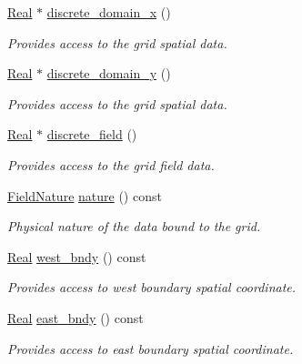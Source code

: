 \begin{DoxyCompactItemize}
\hyperlink{group__c01-roots_gac080bbbf5cbb5502c9f00405f894857d}{Real} $\ast$ \hyperlink{classmtk_1_1UniStgGrid2D_ad5dcac20a90f77a96fb7e843f791eba0}{discrete\+\_\+domain\+\_\+x} ()
\begin{DoxyCompactList}\small\item\em Provides access to the grid spatial data. \end{DoxyCompactList}\item 
\hyperlink{group__c01-roots_gac080bbbf5cbb5502c9f00405f894857d}{Real} $\ast$ \hyperlink{classmtk_1_1UniStgGrid2D_abea1624fd9db856806966151df0ca969}{discrete\+\_\+domain\+\_\+y} ()
\begin{DoxyCompactList}\small\item\em Provides access to the grid spatial data. \end{DoxyCompactList}\item 
\hyperlink{group__c01-roots_gac080bbbf5cbb5502c9f00405f894857d}{Real} $\ast$ \hyperlink{classmtk_1_1UniStgGrid2D_af5b29643a6e50cff2d5d0b2e07f029b7}{discrete\+\_\+field} ()
\begin{DoxyCompactList}\small\item\em Provides access to the grid field data. \end{DoxyCompactList}\item 
\hyperlink{group__c02-enums_ga4c54f2a329cfb4e56213b02a259d19e2}{Field\+Nature} \hyperlink{classmtk_1_1UniStgGrid2D_a99a3a9cdb05b7306be99bde935509e30}{nature} () const 
\begin{DoxyCompactList}\small\item\em Physical nature of the data bound to the grid. \end{DoxyCompactList}\item 
\hyperlink{group__c01-roots_gac080bbbf5cbb5502c9f00405f894857d}{Real} \hyperlink{classmtk_1_1UniStgGrid2D_af2b1712387ded85edaf2b64617d3fc13}{west\+\_\+bndy} () const 
\begin{DoxyCompactList}\small\item\em Provides access to west boundary spatial coordinate. \end{DoxyCompactList}\item 
\hyperlink{group__c01-roots_gac080bbbf5cbb5502c9f00405f894857d}{Real} \hyperlink{classmtk_1_1UniStgGrid2D_a03f689eb29a6369b82ce1207c655d5ff}{east\+\_\+bndy} () const 
\begin{DoxyCompactList}\small\item\em Provides access to east boundary spatial coordinate. \end{DoxyCompactList}\item 

\end{DoxyCompactItemize}
